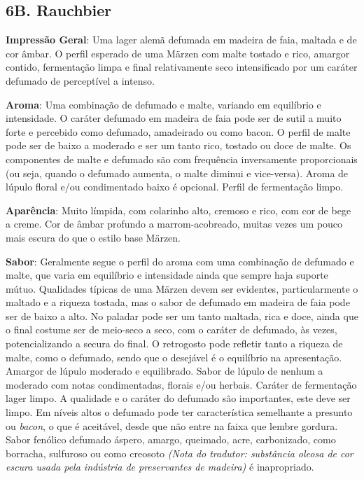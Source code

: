\subsection*{6B. Rauchbier}
\textbf{Impressão Geral}: Uma lager alemã defumada em madeira de faia, maltada e de cor âmbar. O perfil esperado de uma Märzen com malte tostado e rico, amargor contido, fermentação limpa e final relativamente seco intensificado por um caráter defumado de perceptível a intenso.

\textbf{Aroma}: Uma combinação de defumado e malte, variando em equilíbrio e intensidade. O caráter defumado em madeira de faia pode ser de sutil a muito forte e percebido como defumado, amadeirado ou como bacon. O perfil de malte pode ser de baixo a moderado e ser um tanto rico, tostado ou doce de malte. Os componentes de malte e defumado são com frequência inversamente proporcionais (ou seja, quando o defumado aumenta, o malte diminui e vice-versa). Aroma de lúpulo floral e/ou condimentado baixo é opcional. Perfil de fermentação limpo.

\textbf{Aparência}: Muito límpida, com colarinho alto, cremoso e rico, com cor de bege a creme. Cor de âmbar profundo a marrom-acobreado, muitas vezes um pouco mais escura do que o estilo base Märzen.

\textbf{Sabor}: Geralmente segue o perfil do aroma com uma combinação de defumado e malte, que varia em equilíbrio e intensidade ainda que sempre haja suporte mútuo. Qualidades típicas de uma Märzen devem ser evidentes, particularmente o maltado e a riqueza tostada, mas o sabor de defumado em madeira de faia pode ser de baixo a alto. No paladar pode ser um tanto maltada, rica e doce, ainda que o final costume ser de meio-seco a seco, com o caráter de defumado, às vezes, potencializando a secura do final. O retrogosto pode refletir tanto a riqueza de malte, como o defumado, sendo que o desejável é o equilíbrio na apresentação. Amargor de lúpulo moderado e equilibrado. Sabor de lúpulo de nenhum a moderado com notas condimentadas, florais e/ou herbais. Caráter de fermentação lager limpo. A qualidade e o caráter do defumado são importantes, este deve ser limpo. Em níveis altos o defumado pode ter característica semelhante a presunto ou \textit{bacon}, o que é aceitável, desde que não entre na faixa que lembre gordura. Sabor fenólico defumado áspero, amargo, queimado, acre, carbonizado, como borracha, sulfuroso ou como creosoto \textit{(Nota do tradutor: substância oleosa de cor escura usada pela indústria de preservantes de madeira)} é inapropriado.

